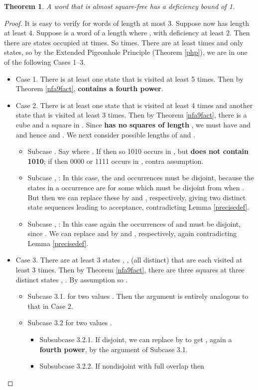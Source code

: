 \documentclass[12pt]{article}
\newcommand{\squarefree}{square-free}
\theoremstyle{plain}
\newtheorem{thm}{Theorem}
\theoremstyle{definition}
\theoremstyle{remark}
\begin{document}
			\begin{thm}\label{almostMain}
				A word that is almost {\squarefree} has a deficiency bound of 1.
			\end{thm}
			\begin{proof}
				It is easy to verify for words of length at most 3.
				Suppose now  has length at least 4.
				Suppose  is a word of a length  where , with deficiency at least 2.
				Then there are  states occupied at  times.
				So  times.
				There are at least  times and only  states, so
				by the Extended Pigeonhole Principle (Theorem \ref{php}), we are in one of the following
				Cases 1--3.
				\begin{itemize}
					\item{}
						Case 1. There is at least one state that is visited at least 5 times.
						Then by Theorem \ref{nfa9fact}, \textbf{ contains a fourth power}.
					\item{}
						Case 2. There is at least one state  that is visited at least 4 times
						and another state  that is visited at least 3 times.
						Then by Theorem \ref{nfa9fact}, there is a cube  and a square  in .
						Since \textbf{ has no squares of length }, we must have
						 and  and hence  and .
						We next consider possible lengths of  and .
						\begin{itemize}
							\item{}
								Subcase . Say  where .
								If  then  so 1010 occurs in , but \textbf{ does not contain 1010};
								if  then 0000 or 1111 occurs in , contra assumption.
							\item{} Subcase , :
								In this case, the  and  occurrences must be disjoint,
								because the states in a  occurrence are  for some
								 which must be disjoint from  when .
								But then we can replace these by  and , respectively,
								giving two distinct state sequences leading to acceptance, contradicting Lemma \ref{precisedef}.
							\item{}
								Subcase , :
								In this case again the occurrences of  and  must be disjoint, since .
								We can replace  and  by  and , respectively,
								again contradicting Lemma \ref{precisedef}.
						\end{itemize}
						\item{}
						Case 3. There are at least 3 states , ,  (all distinct) that are each visited at least 3 times.
						Then by Theorem \ref{nfa9fact}, there are three squares  at three distinct states , .
						By assumption  so .
						\begin{itemize}
							\item{}
								Subcase 3.1.  for two values .
								Then the argument is entirely analogous to that in Case 2.
							\item{} Subcase 3.2
								 for two values .
						\begin{itemize}
							\item{} Subsubcase 3.2.1.
								If disjoint, we can replace  by  to get , again a \textbf{fourth power},
								by the argument of Subcase 3.1.
							\item{} Subsubcase 3.2.2.
								If nondisjoint with full overlap then
								

\end{itemize}
\end{itemize}
\end{itemize}
\end{proof}
\end{document}
